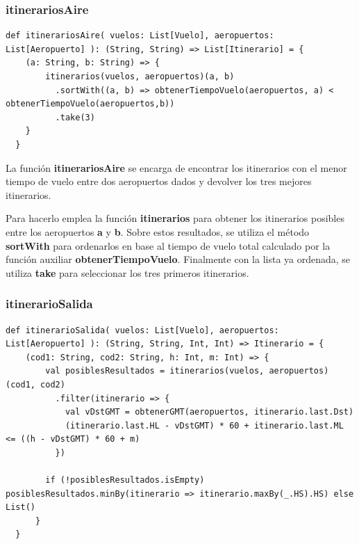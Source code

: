 \documentclass[letterpaper]{article}
\begin{document}
\subsubsection{itinerariosAire}
\begin{lstlisting}[caption={Función para minimizar el tiempo total de vuelo}, label={lst:itinerariosAire}, captionpos=b]
  def itinerariosAire( vuelos: List[Vuelo], aeropuertos: List[Aeropuerto] ): (String, String) => List[Itinerario] = {
    (a: String, b: String) => {
        itinerarios(vuelos, aeropuertos)(a, b)
          .sortWith((a, b) => obtenerTiempoVuelo(aeropuertos, a) < obtenerTiempoVuelo(aeropuertos,b))
          .take(3)
    }
  }

\end{lstlisting}

La función \textbf{itinerariosAire} se encarga de encontrar los itinerarios con el menor tiempo de vuelo entre dos aeropuertos dados y devolver los tres mejores itinerarios.

Para hacerlo emplea la función \textbf{itinerarios} para obtener los itinerarios posibles entre los aeropuertos \textbf{a} y \textbf{b}. Sobre estos resultados, se utiliza el método \textbf{sortWith} para ordenarlos en base al tiempo de vuelo total calculado por la función auxiliar \textbf{obtenerTiempoVuelo}. Finalmente con la lista ya ordenada, se utiliza \textbf{take} para seleccionar los tres primeros itinerarios.

\subsubsection{itinerarioSalida}\label{itinerarioSalida}

\begin{lstlisting}[caption={Función para optimizar la hora de salida}, label={lst:itinerarioSalida}, captionpos=b]
  def itinerarioSalida( vuelos: List[Vuelo], aeropuertos: List[Aeropuerto] ): (String, String, Int, Int) => Itinerario = {
    (cod1: String, cod2: String, h: Int, m: Int) => {
        val posiblesResultados = itinerarios(vuelos, aeropuertos)(cod1, cod2)
          .filter(itinerario => {
            val vDstGMT = obtenerGMT(aeropuertos, itinerario.last.Dst)
            (itinerario.last.HL - vDstGMT) * 60 + itinerario.last.ML <= ((h - vDstGMT) * 60 + m)
          })

        if (!posiblesResultados.isEmpty) posiblesResultados.minBy(itinerario => itinerario.maxBy(_.HS).HS) else List()
      }
  }
\end{lstlisting}
\end{document}

